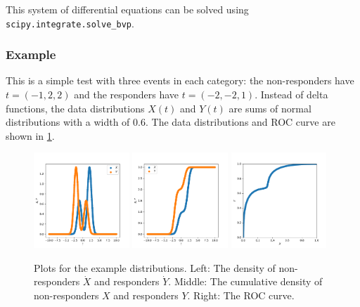 \documentclass[11pt]{article}
\newcommand{\Xdot}{\dot{X}}
\newcommand{\Ydot}{\dot{Y}}
\begin{document}
This system of differential equations can be solved using \texttt{scipy.integrate.solve\_bvp}.

\subsubsection{Example}

This is a simple test with three events in each category: the non-responders have \(t=\left(-1, 2, 2\right)\) and the responders have \(t=\left(-2, -2, 1\right)\).  Instead of delta functions, the data distributions \(X(t)\) and \(Y(t)\) are sums of normal distributions with a width of \(0.6\).  The data distributions and ROC curve are shown in \cref{fig:exampledata}.

\begin{figure}
\begin{center}
\includegraphics[width=0.32\textwidth]{exampleXdotYdot.pdf}
\includegraphics[width=0.32\textwidth]{exampleXY.pdf}
\includegraphics[width=0.32\textwidth]{exampleroc.pdf}
\caption{Plots for the example distributions.  Left: The density of non-responders \(\Xdot\) and responders \(\Ydot\).  Middle: The cumulative density of non-responders \(X\) and responders \(Y\).  Right: The ROC curve.\label{fig:exampledata}}
\end{center}
\end{figure}
\end{document}
